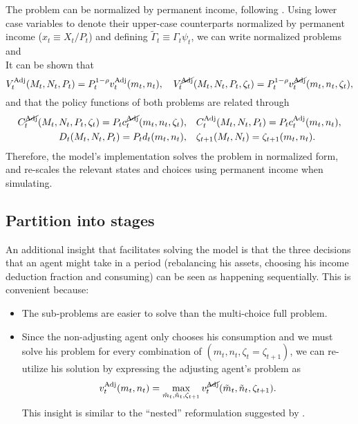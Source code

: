 \documentclass[./RiskyContrib.tex]{subfiles}
\begin{document}
The problem can be normalized by permanent income, following
\cite{Carroll2020solvingmicrodsops}. Using lower case variables to
denote their upper-case counterparts normalized by permanent income ($x_t \equiv X_t/P_t$)
and defining $\tilde{\Gamma}_t \equiv \Gamma_{t}\psi_{t}$, we can write
normalized problems
\begin{equation}\label{eq:bellman_NAdj_norm}

\end{equation}
and
\begin{equation}\label{eq:bellman_Adj_norm}

\end{equation}
It can be shown that
\begin{equation*}
V_{t}^{\text{Adj}}(M_t,N_t,P_t) = P_t^{1-\rho} v_{t}^{\text{Adj}}(m_t,n_t), \quad
V_{t}^{\cancel{\text{Adj}}}(M_t,N_t,P_t,\zeta_t) = P_t^{1-\rho} v_{t}^{\cancel{\text{Adj}}}(m_t,n_t,\zeta_t),
\end{equation*}
and that the policy functions of both problems are related through
\begin{equation*}
\begin{split}
C_t^{\cancel{\text{Adj}}}(M_t,N_t,P_t,\zeta_t) = P_t c_t^{\cancel{\text{Adj}}}(m_t,n_t,\zeta_t),& \quad C_t^{\text{Adj}}(M_t,N_t,P_t) = P_t c_t^{\text{Adj}}(m_t,n_t),\\
D_t(M_t,N_t,P_t) = P_t d_t(m_t,n_t),& \quad \zeta_{t+1}(M_t,N_t) = \zeta_{t+1}(m_t,n_t).
\end{split}
\end{equation*}
Therefore, the model's implementation solves the problem in normalized form, and re-scales
the relevant states and choices using permanent income when simulating.

\subsection{Partition into stages}

An additional insight that facilitates solving the model is that the three decisions
that an agent might take in a period (rebalancing his assets, choosing his income
deduction fraction and consuming) can be seen as happening sequentially. This is
convenient because:
\begin{itemize}
\item The sub-problems are easier to solve than the multi-choice full problem.
\item Since the non-adjusting agent only chooses his consumption and we must
solve his problem for every combination of $(m_t, n_t, \zeta_t=\zeta_{t+1})$, we can re-utilize
his solution by expressing the adjusting agent's  problem as
\begin{equation*}
v_t^{\text{Adj}}(m_t,n_t) = \max_{\tilde{m}_t, \tilde{n}_t, \zeta_{t+1}} v_t^{\cancel{\text{Adj}}}(\tilde{m}_t, \tilde{n}_t, \zeta_{t+1}).
\end{equation*}
This insight is similar to the ``nested'' reformulation suggested by \cite{Druedahl2020compecon}.
\end{itemize}
\end{document}
